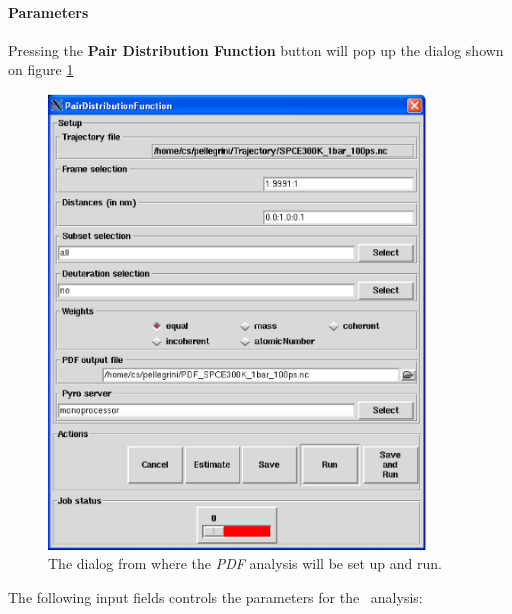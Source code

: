 \documentclass[a4paper,11pt]{report}
\begin{document}
\paragraph{Parameters\\}
\label{pdf_parameters}
Pressing the \textbf{Pair Distribution Function} button will pop up the dialog shown on figure \ref{fig:pdf}
\begin{figure}[h!]
\begin{center}
\includegraphics[width=10cm]{Figures/pdf.eps}
\end{center}
\caption[The \textit{PDF} analysis dialog]{The dialog from where the \textit{PDF} analysis will be set up and run.}
\label{fig:pdf}
\end{figure}   

The following input fields controls the parameters for the \PDF\ analysis:
\end{document}
